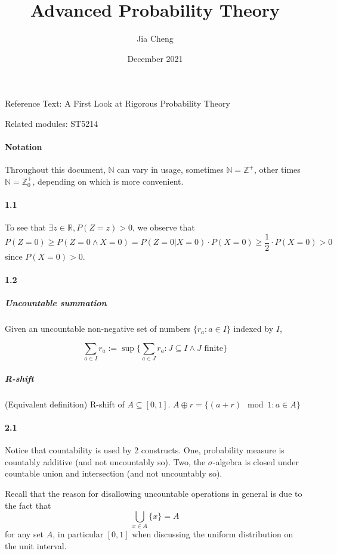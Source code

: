\documentclass[a4paper]{article}
\title{Advanced Probability Theory}
\author{Jia Cheng}
\date{December 2021}
\begin{document}
\maketitle

Reference Text: A First Look at Rigorous Probability Theory

Related modules: ST5214

\paragraph{Notation} Throughout this document, $\mathbb{N}$ can vary in usage, sometimes $\mathbb{N}=\mathbb{Z}^+$, other times $\mathbb{N}=\mathbb{Z}^+_0$, depending on which is more convenient.

\paragraph{1.1}

To see that $\exists z\in \mathbb{R}, P(Z=z) > 0$, we observe that
\[P(Z=0)\geq P(Z=0\land X=0) = P(Z=0|X=0)\cdot P(X=0)\geq \frac{1}{2}\cdot P(X=0) > 0\]
since $P(X=0) > 0$.


\paragraph{1.2}

\subparagraph{Uncountable summation} Given an uncountable non-negative set of numbers $\{r_a : a\in I\}$ indexed by $I$,

\[\sum_{a\in I}r_a := \sup \{\sum_{a\in J}r_a : J\subseteq I\land J \text{ finite}\}\]

\subparagraph{R-shift}
(Equivalent definition) R-shift of $A\subseteq [0, 1]$. $A\oplus r = \{(a + r)\mod 1 : a\in A\}$


\paragraph{2.1}

Notice that countability is used by 2 constructs. One, probability measure is countably additive (and not uncountably so). Two, the $\sigma$-algebra is closed under countable union and intersection (and not uncountably so).

Recall that the reason for disallowing uncountable operations in general is due to the fact that
\[\bigcup_{x\in A}\{x\} = A\]
for any set $A$, in particular $[0,1]$ when discussing the uniform distribution on the unit interval.
\end{document}
